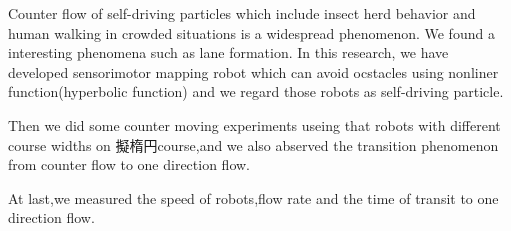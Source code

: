 Counter flow of self-driving particles which include insect herd behavior and 
human walking in crowded situations is a widespread phenomenon.
We found a interesting phenomena such as lane formation.
In this research, we have developed sensorimotor mapping robot which can avoid 
ocstacles using nonliner function(hyperbolic function) and we regard those 
robots as self-driving particle.

Then we did some counter moving experiments useing that robots with different course 
widths on  擬楕円course,and we also abserved the transition phenomenon from counter
flow to one direction flow.

At last,we measured the speed of robots,flow rate and the time of transit to 
one direction flow. 
